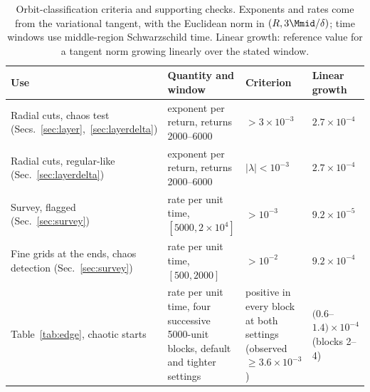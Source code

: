 \begin{table}[!tbp]
\centering\small
\caption{Orbit-classification criteria and supporting checks.
Exponents and rates come from the variational tangent, with the Euclidean norm in $(R, 3\Mmid/\delta)$;
time windows use middle-region Schwarzschild time.
Linear growth: reference value for a tangent norm growing linearly over the stated window.}
\label{tab:criteria}
\begin{tabular}{>{\raggedright}p{}>{\raggedright}p{}>{\raggedright}p{}>{\raggedright\arraybackslash}p{}}
\toprule
Use & Quantity and window & Criterion & Linear growth \\
\midrule
Radial cuts, chaos test (Secs.~\ref{sec:layer},~\ref{sec:layerdelta}) & exponent per return, returns 2000--6000 & $> 3\times10^{-3}$ & $2.7\times10^{-4}$ \\
Radial cuts, regular-like (Sec.~\ref{sec:layerdelta}) & exponent per return, returns 2000--6000 & $|\lambda| < 10^{-3}$ & $2.7\times10^{-4}$ \\
Survey, flagged (Sec.~\ref{sec:survey}) & rate per unit time, $[5000, 2\times10^4]$ & $> 10^{-3}$ & $9.2\times10^{-5}$ \\
Fine grids at the ends, chaos detection (Sec.~\ref{sec:survey}) & rate per unit time, $[500, 2000]$ & $> 10^{-2}$ & $9.2\times10^{-4}$ \\
Table~\ref{tab:edge}, chaotic starts & rate per unit time, four successive 5000-unit blocks, default and tighter settings & positive in every block at both settings (observed $\ge 3.6\times10^{-3}$) & $(0.6$--$1.4)\times10^{-4}$ (blocks 2--4) \\
\bottomrule
\end{tabular}
\end{table}
